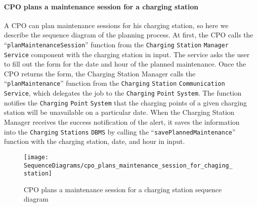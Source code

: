 \paragraph{CPO plans a maintenance session for a charging station}
A CPO can plan maintenance sessions for his charging station, so here we describe the sequence diagram of the planning process.
At first, the CPO calls the ``\verb|planMaintenanceSession|'' function from the \verb|Charging| \verb|Station| \verb|Manager| \verb|Service| component with the charging station in input.
The service asks the user to fill out the form for the date and hour of the planned maintenance.
Once the CPO returns the form, the Charging Station Manager calls the ``\verb|planMaintenance|'' function from the \verb|Charging| \verb|Station| \verb|Communication| \verb|Service|, which delegates the job to the \verb|Charging| \verb|Point| \verb|System|.
The function notifies the \verb|Charging| \verb|Point| \verb|System| that the charging points of a given charging station will be unavailable on a particular date.
When the Charging Station Manager receives the success notification of the alert, it saves the information into the \verb|Charging| \verb|Stations| \verb|DBMS| by calling the ``\verb|savePlannedMaintenance|'' function with the charging station, date, and hour in input.
\begin{figure}[H]
    \begin{center}
        \texttt{[image: SequenceDiagrams/cpo\_plans\_maintenance\_session\_for\_chaging\_station]}
        \caption{CPO plans a maintenance session for a charging station sequence diagram}
        \label{cpo_plans_maintenance_session_for_charging_station}
    \end{center}
\end{figure}

